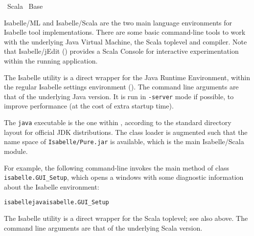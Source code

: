 %
\begin{isabellebody}%
\def\isabellecontext{Scala}%
%
\isadelimtheory
%
\endisadelimtheory
%
\isatagtheory
{}\isamarkupfalse%
\ Scala\isanewline
{}\ Base\isanewline
{}%
\endisatagtheory
{\isafoldtheory}%
%
\isadelimtheory
%
\endisadelimtheory
%
\isamarkuptrue%
%
\begin{isamarkuptext}%
Isabelle/ML and Isabelle/Scala are the two main language
environments for Isabelle tool implementations.  There are some basic
command-line tools to work with the underlying Java Virtual Machine,
the Scala toplevel and compiler.  Note that Isabelle/jEdit
() provides a Scala Console for interactive
experimentation within the running application.%
\end{isamarkuptext}%
\isamarkuptrue%
%
\isamarkuptrue%
%
\begin{isamarkuptext}%
The Isabelle \hypertarget{tool.java}{\hyperlink{tool.java}{\mbox{}}} utility is a direct wrapper for
  the Java Runtime Environment, within the regular Isabelle settings
  environment ().  The command line arguments are
  that of the underlying Java version.  It is run in \verb|-server| mode if possible, to improve performance (at the cost of
  extra startup time).

  The \verb|java| executable is the one within \hyperlink{setting.ISABELLE-JDK-HOME}{\mbox{}}, according to the standard directory layout for
  official JDK distributions.  The class loader is augmented such that
  the name space of \verb|Isabelle/Pure.jar| is available,
  which is the main Isabelle/Scala module.

  For example, the following command-line invokes the main method of
  class \verb|isabelle.GUI_Setup|, which opens a windows with
  some diagnostic information about the Isabelle environment:
\begin{alltt}
  isabelle java isabelle.GUI_Setup
\end{alltt}%
\end{isamarkuptext}%
\isamarkuptrue%
%
\isamarkuptrue%
%
\begin{isamarkuptext}%
The Isabelle \hypertarget{tool.scala}{\hyperlink{tool.scala}{\mbox{}}} utility is a direct wrapper for
  the Scala toplevel; see also \hyperlink{tool.java}{\mbox{}} above.  The command line
  arguments are that of the underlying Scala version.


\end{isamarkuptext}
\end{isabellebody}

